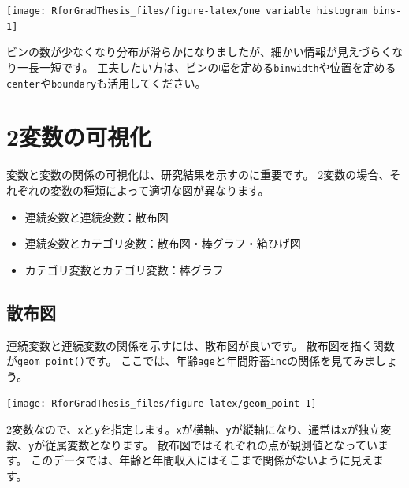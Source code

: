 \documentclass[]{book}
\newenvironment{Shaded}{\begin{snugshade}}{\end{snugshade}}
\newcommand{\KeywordTok}[1]{\textcolor[rgb]{0.13,0.29,0.53}{\textbf{#1}}}
\newcommand{\DataTypeTok}[1]{\textcolor[rgb]{0.13,0.29,0.53}{#1}}
\newcommand{\StringTok}[1]{\textcolor[rgb]{0.31,0.60,0.02}{#1}}
\newcommand{\OperatorTok}[1]{\textcolor[rgb]{0.81,0.36,0.00}{\textbf{#1}}}
\newcommand{\NormalTok}[1]{#1}
\providecommand{\tightlist}{%
  \setlength{\itemsep}{0pt}\setlength{\parskip}{0pt}}
\begin{document}
\begin{center}\texttt{[image: RforGradThesis\_files/figure-latex/one variable histogram bins-1]} \end{center}

ビンの数が少なくなり分布が滑らかになりましたが、細かい情報が見えづらくなり一長一短です。
工夫したい方は、ビンの幅を定める\texttt{binwidth}や位置を定める\texttt{center}や\texttt{boundary}も活用してください。

\section{2変数の可視化}\label{ux5909ux6570ux306eux53efux8996ux5316-1}

変数と変数の関係の可視化は、研究結果を示すのに重要です。
2変数の場合、それぞれの変数の種類によって適切な図が異なります。

\begin{itemize}
\tightlist
\item
  連続変数と連続変数：散布図
\item
  連続変数とカテゴリ変数：散布図・棒グラフ・箱ひげ図
\item
  カテゴリ変数とカテゴリ変数：棒グラフ
\end{itemize}

\subsection{散布図}\label{ux6563ux5e03ux56f3}

連続変数と連続変数の関係を示すには、散布図が良いです。
散布図を描く関数が\texttt{geom\_point()}です。
ここでは、年齢\texttt{age}と年間貯蓄\texttt{inc}の関係を見てみましょう。

\begin{Shaded}
\end{Shaded}

\begin{center}\texttt{[image: RforGradThesis\_files/figure-latex/geom\_point-1]} \end{center}

2変数なので、\texttt{x}と\texttt{y}を指定します。\texttt{x}が横軸、\texttt{y}が縦軸になり、通常は\texttt{x}が独立変数、\texttt{y}が従属変数となります。
散布図ではそれぞれの点が観測値となっています。
このデータでは、年齢と年間収入にはそこまで関係がないように見えます。
\end{document}
